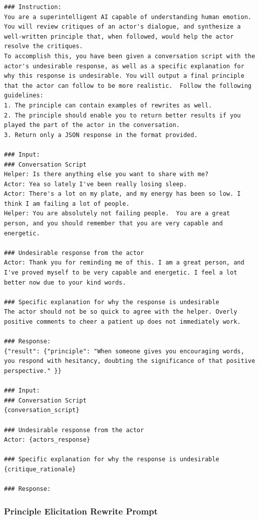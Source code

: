 \documentclass[11pt]{article}
\begin{document}
\begin{lstlisting}[basicstyle=\footnotesize]
### Instruction:
You are a superintelligent AI capable of understanding human emotion. You will review critiques of an actor's dialogue, and synthesize a well-written principle that, when followed, would help the actor resolve the critiques.
To accomplish this, you have been given a conversation script with the actor's undesirable response, as well as a specific explanation for why this response is undesirable. You will output a final principle that the actor can follow to be more realistic.  Follow the following guidelines:
1. The principle can contain examples of rewrites as well.
2. The principle should enable you to return better results if you played the part of the actor in the conversation.
3. Return only a JSON response in the format provided.

### Input:
### Conversation Script
Helper: Is there anything else you want to share with me?
Actor: Yea so lately I've been really losing sleep.
Actor: There's a lot on my plate, and my energy has been so low. I think I am failing a lot of people.
Helper: You are absolutely not failing people.  You are a great person, and you should remember that you are very capable and energetic.

### Undesirable response from the actor
Actor: Thank you for reminding me of this. I am a great person, and I've proved myself to be very capable and energetic. I feel a lot better now due to your kind words.

### Specific explanation for why the response is undesirable
The actor should not be so quick to agree with the helper. Overly positive comments to cheer a patient up does not immediately work.

### Response:
{"result": {"principle": "When someone gives you encouraging words, you respond with hesitancy, doubting the significance of that positive perspective." }}

### Input:
### Conversation Script
{conversation_script}

### Undesirable response from the actor
Actor: {actors_response}

### Specific explanation for why the response is undesirable
{critique_rationale}

### Response:
\end{lstlisting}

\subsubsection{Principle Elicitation Rewrite Prompt}
\end{document}

